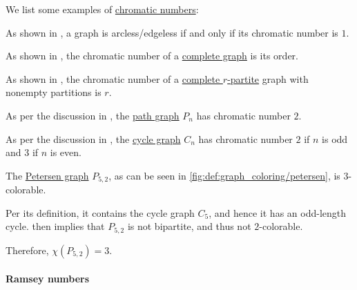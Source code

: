 \begin{example}\label{ex:def:graph_chromatic_number}
  We list some examples of \hyperref[def:graph_chromatic_number]{chromatic numbers}:
  \begin{thmenum}
     As shown in , a graph is arcless/edgeless if and only if its chromatic number is \( 1 \).

     As shown in , the chromatic number of a \hyperref[def:complete_graph]{complete graph} is its order.

     As shown in , the chromatic number of a \hyperref[def:complete_multipartite_graph]{complete \( r \)-partite} graph with nonempty partitions is \( r \).

     As per the discussion in , the \hyperref[def:path_graph]{path graph} \( P_n \) has chromatic number \( 2 \).

     As per the discussion in , the \hyperref[def:cycle_graph]{cycle graph} \( C_n \) has chromatic number \( 2 \) if \( n \) is odd and \( 3 \) if \( n \) is even.

     The \hyperref[def:petersen_graph]{Petersen graph} \( P_{5,2} \), as can be seen in \cref{fig:def:graph_coloring/petersen}, is \( 3 \)-colorable.

    Per its definition, it contains the cycle graph \( C_5 \), and hence it has an odd-length cycle.  then implies that \( P_{5,2} \) is not bipartite, and thus not \( 2 \)-colorable.

    Therefore, \( \chi(P_{5,2}) = 3 \).
  \end{thmenum}
\end{example}

\paragraph{Ramsey numbers}

